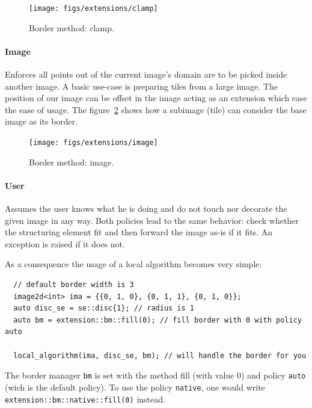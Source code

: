 \begin{figure}[tbh]
  \centering
  \texttt{[image: figs/extensions/clamp]}
  \label{fig:border.clamp}
  \caption{Border method: clamp.}
\end{figure}

\paragraph{Image} Enforces all points out of the current image's domain are to be picked inside another image. A basic
use-case is preparing tiles from a large image. The position of our image can be offset in the image acting as an
extension which ease the ease of usage. The figure~\cref{fig:border.image} shows how a subimage (tile) can consider the
base image as its border.

\begin{figure}[tbh]
  \centering
  \texttt{[image: figs/extensions/image]}
  \label{fig:border.image}
  \caption{Border method: image.}
\end{figure}


\paragraph{User} Assumes the user knows what he is doing and do not touch nor decorate the given image in any way. Both
policies lead to the same behavior: check whether the structuring element fit and then forward the image as-is if it
fits. An exception is raised if it does not.

As a consequence the usage of a local algorithm becomes very simple:

\begin{verbatim}
  // default border width is 3
  image2d<int> ima = {{0, 1, 0}, {0, 1, 1}, {0, 1, 0}};
  auto disc_se = se::disc{1}; // radius is 1
  auto bm = extension::bm::fill(0); // fill border with 0 with policy auto

  local_algorithm(ima, disc_se, bm); // will handle the border for you
\end{verbatim}

The border manager \texttt{bm} is set with the method fill (with value 0) and policy \texttt{auto} (wich is the default
policy). To use the policy \texttt{native}, one would write \texttt{extension::bm::native::fill(0)} instead.

